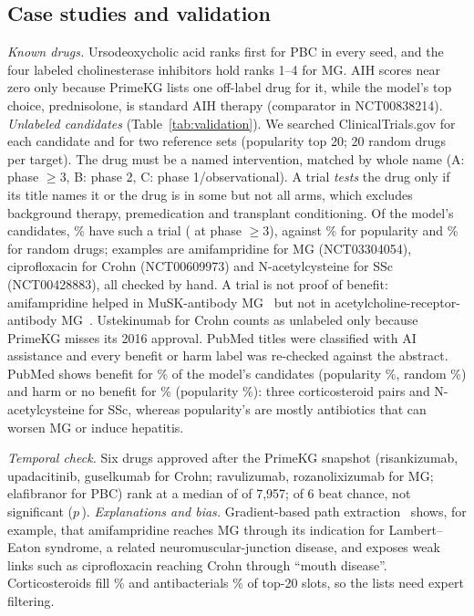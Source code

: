 \documentclass[conference]{IEEEtran}
\begin{document}
\subsection{Case studies and validation}
\emph{Known drugs.} Ursodeoxycholic acid ranks first for PBC in every seed, and the four labeled cholinesterase inhibitors hold ranks 1--4 for MG. AIH scores near zero only because PrimeKG lists one off-label drug for it, while the model's top choice, prednisolone, is standard AIH therapy (comparator in NCT00838214).
\emph{Unlabeled candidates} (Table~\ref{tab:validation}). We searched ClinicalTrials.gov for each candidate and for two reference sets (popularity top 20; 20 random drugs per target). The drug must be a named intervention, matched by whole name (A: phase $\geq$3, B: phase 2, C: phase 1/observational). A trial \emph{tests} the drug only if its title names it or the drug is in some but not all arms, which excludes background therapy, premedication and transplant conditioning. Of the model's candidates, \ValTrialTestedModel\% have such a trial (\ValGradeATested{} at phase $\geq$3), against \ValTrialTestedPop\% for popularity and \ValTrialTestedRand\% for random drugs; examples are amifampridine for MG (NCT03304054), ciprofloxacin for Crohn (NCT00609973) and N-acetylcysteine for SSc (NCT00428883), all checked by hand. A trial is not proof of benefit: amifampridine helped in MuSK-antibody MG~\cite{bonanno2018amifampridine} but not in acetylcholine-receptor-antibody MG~\cite{remijn2026amifampridine}. Ustekinumab for Crohn counts as unlabeled only because PrimeKG misses its 2016 approval. PubMed titles were classified with AI assistance and every benefit or harm label was re-checked against the abstract. PubMed shows benefit for \ValLitSupModel\% of the model's candidates (popularity \ValLitSupPop\%, random \ValLitSupRand\%) and harm or no benefit for \ValLitAgainstModel\% (popularity \ValLitAgainstPop\%): three corticosteroid pairs and N-acetylcysteine for SSc, whereas popularity's are mostly antibiotics that can worsen MG or induce hepatitis.

\begin{table}[tb]
\centering
\caption{Evidence for unlabeled top-20 candidates (6 targets) and two reference sets (Ours $n$=\ValNovelN; Pop., Random $n$=120; grades as in the text).}
\label{tab:validation}
\scriptsize
\setlength{\tabcolsep}{2.5pt}

\end{table}
\emph{Temporal check.} Six drugs approved after the PrimeKG snapshot (risankizumab, upadacitinib, guselkumab for Crohn; ravulizumab, rozanolixizumab for MG; elafibranor for PBC) rank at a median of \TempPostMedRank{} of 7,957; \TempPostBetter{} of 6 beat chance, not significant ($p$\,\TempPostP).
\emph{Explanations and bias.} Gradient-based path extraction~\cite{zhu2021nbfnet} shows, for example, that amifampridine reaches MG through its indication for Lambert--Eaton syndrome, a related neuromuscular-junction disease, and exposes weak links such as ciprofloxacin reaching Crohn through ``mouth disease''. Corticosteroids fill \ValSteroidShare\% and antibacterials \ValAntibioticShare\% of top-20 slots, so the lists need expert filtering.
\end{document}
